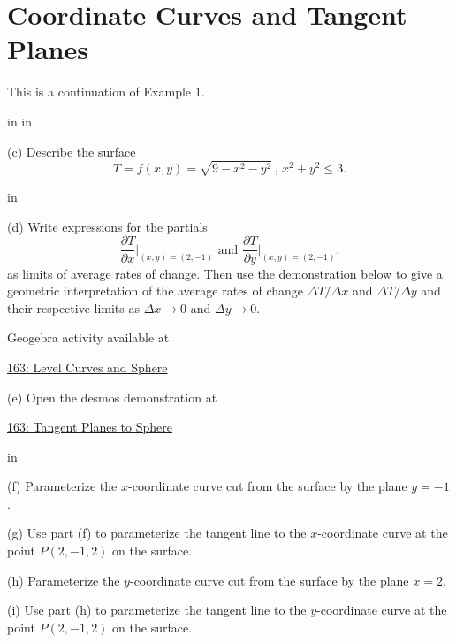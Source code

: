 \documentclass{ximera}
\newcommand{\pskip}{\vskip 0.1 in}
\begin{document}
\section{Coordinate Curves and Tangent Planes}


\begin{example}  \label{Esdtr435r}
This is a continuation of Example 1. 

\pskip \pskip

(c) Describe the surface
\[
  T = f(x,y) = \sqrt{9-x^2-y^2} \, , \, x^2 + y^2 \leq 3 .
\]

\pskip

(d) Write expressions  for the partials
\[
    \frac{\partial T}{\partial x}\Big|_{(x,y)=(2,-1)} \text{ and } \frac{\partial T}{\partial y}\Big|_{(x,y)=(2,-1)} .
\]
as limits of average rates of change. Then use the demonstration below to give a geometric interpretation of the average rates of change $\Delta T/\Delta x$ and $\Delta T/\Delta y$ and their respective limits as $\Delta x\to 0$ and $\Delta y\to 0$.

 
\begin{onlineOnly}
    \begin{center}
\end{center}
\end{onlineOnly}

Geogebra activity available at

\href{https://www.geogebra.org/classic/egnkjkqw}{163: Level Curves and Sphere}




(e) Open the desmos demonstration at

\href{https://www.desmos.com/3d/967c10cbdc}{163: Tangent Planes to Sphere}

\pskip

(f) Parameterize the $x$-coordinate curve cut from the surface by the plane $y=-1$.

(g) Use part (f) to parameterize the tangent line to the $x$-coordinate curve at the point $P(2,-1,2)$ on the surface.

(h) Parameterize the $y$-coordinate curve cut from the surface by the plane $x=2$.

(i) Use part (h) to parameterize the tangent line to the $y$-coordinate curve at the point $P(2,-1,2)$ on the surface.


\end{example}
\end{document}
